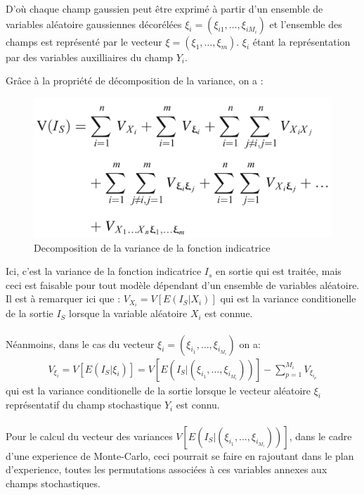 \documentclass[a4paper,10pt]{article}
\begin{document}
D'où chaque champ gaussien peut être exprimé à partir d'un ensemble de variables aléatoire gaussiennes décorélées $\xi_{i}=(\xi_{i1},\ldots,\xi_{iM_{i}})$ et l'ensemble des champs est représenté par le vecteur $\xi=(\xi_{1},\ldots,\xi_{m})$. $\xi_{i}$ étant la représentation par des variables auxilliaires du champ $Y_{i}$. 

Grâce à la propriété de décomposition de la variance, on a :

\begin{figure}[H]
   \centering   
   \includegraphics[scale=0.175]{DecompositionVariance.png}
      \caption{Decomposition de la variance de la fonction indicatrice}
         \label{VarDecompo}
\end{figure}

Ici, c'est la variance de la fonction indicatrice $I_{s}$ en sortie qui est traitée, mais ceci est faisable pour tout modèle dépendant d'un ensemble de variables aléatoire. Il est à remarquer ici que : 
$V_{X_{i}} = V\left[E\left(I_{S}|X_{i}\right)\right]$ qui est la variance conditionelle de la sortie $I_{S}$ lorsque la variable aléatoire $X_{i}$ est connue. \\ 
\\
Néanmoins, dans le cas du vecteur $\xi_{i} = (\xi_{i_{1}},\ldots,\xi_{i_{M_{i}}})$ on a: \\
\begin{eqnarray}
V_{\xi_{i}} = V\left[E\left(I_{S}|\xi_{i}\right)\right] = V\left[E\left(I_{S}|(\xi_{i_{1}},\ldots,\xi_{i_{M_{i}}})\right)\right] - \sum_{p=1}^{M_{i}}V_{\xi_{i_{p}}}
\end{eqnarray}
qui est la variance conditionelle de la sortie lorsque le vecteur aléatoire $\xi_{i}$ représentatif du champ stochastique $Y_{i}$ est connu.\\
\\  
Pour le calcul du vecteur des variances $V\left[E\left(I_{S}|(\xi_{i_{1}},\ldots,\xi_{i_{M_{i}}})\right)\right]$, dans le cadre d'une experience de Monte-Carlo, ceci pourrait se faire en rajoutant dans le plan d'experience, toutes les permutations associées à ces variables annexes aux champs stochastiques. \\
\end{document}
